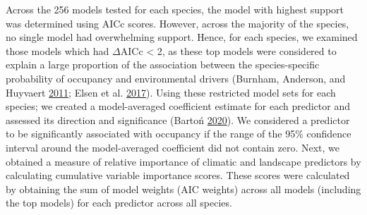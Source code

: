 \documentclass[]{article}
\begin{document}
Across the 256 models tested for each species, the model with highest support was determined using AICc scores. However, across the majority of the species, no single model had overwhelming support. Hence, for each species, we examined those models which had \(\Delta\)AICc \textless{} 2, as these top models were considered to explain a large proportion of the association between the species-specific probability of occupancy and environmental drivers (Burnham, Anderson, and Huyvaert \protect\hyperlink{ref-burnham2011}{2011}; Elsen et al. \protect\hyperlink{ref-elsen2017}{2017}). Using these restricted model sets for each species; we created a model-averaged coefficient estimate for each predictor and assessed its direction and significance (Bartoń \protect\hyperlink{ref-MuMIn}{2020}). We considered a predictor to be significantly associated with occupancy if the range of the 95\% confidence interval around the model-averaged coefficient did not contain zero. Next, we obtained a measure of relative importance of climatic and landscape predictors by calculating cumulative variable importance scores. These scores were calculated by obtaining the sum of model weights (AIC weights) across all models (including the top models) for each predictor across all species.
\end{document}
